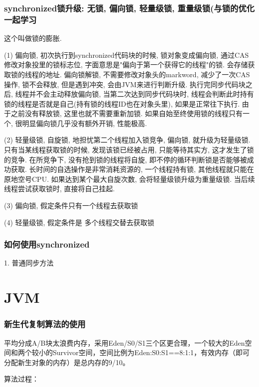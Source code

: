 \documentclass[UTF8]{ctexart}
\begin{document}
\subsubsection{synchronized锁升级: 无锁, 偏向锁, 轻量级锁, 重量级锁(与锁的优化一起学习}
这个叫做锁的膨胀. \par
(1) 偏向锁, 初次执行到synchronized代码块的时候, 锁对象变成偏向锁, 通过CAS修改对象投里的锁标志位, 字面意思是"偏向于第一个获得它的线程"的锁. 会存储获取锁的线程的地址. 偏向锁解锁, 不需要修改对象头的markword, 减少了一次CAS操作, 锁不会释放, 但是遇到冲突, 会由JVM来进行判断升级. 执行完同步代码块之后, 线程并不会主动释放偏向锁, 当第二次达到同步代码块时, 线程会判断此时持有锁的线程是否就是自己(持有锁的线程ID也在对象头里), 如果是正常往下执行. 由于之前没有释放锁, 这里也就不需要重新加锁. 如果自始至终使用锁的线程只有一个, 很明显偏向锁几乎没有额外开销, 性能极高. \par
(2) 轻量级锁, 自旋锁, 地担忧第二个线程加入锁竞争, 偏向锁, 就升级为轻量级锁. 只有当某线程获取锁的时候, 发现该锁已经被占用, 只能等待其实方, 这才发生了锁的竞争. 在所竞争下, 没有抢到锁的线程将自旋, 即不停的循环判断锁是否能够被成功获取. 长时间的自选操作是非常消耗资源的, 一个线程持有锁, 其他线程就只能在原地空号CPU. 如果达到某个最大自旋次数, 会将轻量级锁升级为重量级锁. 当后续线程尝试获取锁时, 直接将自己挂起.\par
(3) 偏向锁, 假定条件只有一个线程去获取锁 \par
(4) 轻量级锁, 假定条件是 多个线程交替去获取锁 \par
\subsubsection{如何使用synchronized}
1. 普通同步方法

\section{JVM}
\subsubsection{新生代复制算法的使用}
平均分成A/B块太浪费内存，采用Eden/S0/S1三个区更合理，一个较大的Eden空间和两个较小的Survivor空间，空间比例为Eden:S0:S1==8:1:1，有效内存（即可分配新生对象的内存）是总内存的9/10。

算法过程：
\end{document}
